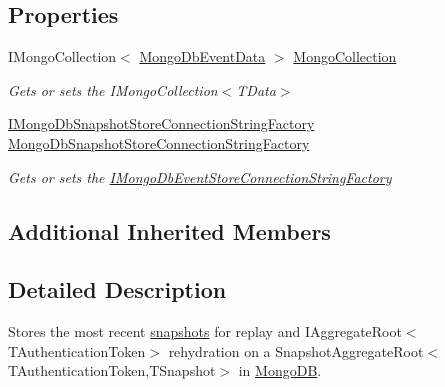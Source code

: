\subsection*{Properties}
\begin{DoxyCompactItemize}
\item 
I\+Mongo\+Collection$<$ \hyperlink{classCqrs_1_1MongoDB_1_1Events_1_1MongoDbEventData}{Mongo\+Db\+Event\+Data} $>$ \hyperlink{classCqrs_1_1MongoDB_1_1Events_1_1MongoDbSnapshotStore_ac7606deddbb126b8ff75bd0c774719f5_ac7606deddbb126b8ff75bd0c774719f5}{Mongo\+Collection}
\begin{DoxyCompactList}\small\item\em Gets or sets the I\+Mongo\+Collection$<$\+T\+Data$>$ \end{DoxyCompactList}\item 
\hyperlink{interfaceCqrs_1_1MongoDB_1_1Events_1_1IMongoDbSnapshotStoreConnectionStringFactory}{I\+Mongo\+Db\+Snapshot\+Store\+Connection\+String\+Factory} \hyperlink{classCqrs_1_1MongoDB_1_1Events_1_1MongoDbSnapshotStore_a8e5a5b89b00194a1307a31f4dce718e7_a8e5a5b89b00194a1307a31f4dce718e7}{Mongo\+Db\+Snapshot\+Store\+Connection\+String\+Factory}
\begin{DoxyCompactList}\small\item\em Gets or sets the \hyperlink{interfaceCqrs_1_1MongoDB_1_1Events_1_1IMongoDbEventStoreConnectionStringFactory}{I\+Mongo\+Db\+Event\+Store\+Connection\+String\+Factory} \end{DoxyCompactList}\end{DoxyCompactItemize}
\subsection*{Additional Inherited Members}


\subsection{Detailed Description}
Stores the most recent \hyperlink{}{snapshots} for replay and I\+Aggregate\+Root$<$\+T\+Authentication\+Token$>$ rehydration on a Snapshot\+Aggregate\+Root$<$\+T\+Authentication\+Token,\+T\+Snapshot$>$ in \hyperlink{namespaceCqrs_1_1MongoDB}{Mongo\+DB}. 



